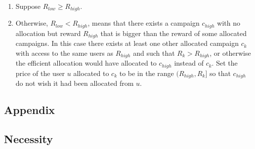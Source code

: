 \documentclass[12pt,letterpaper]{article}
\newcommand{\Campaign}{c}
\newcommand{\User}{u}
\newcommand{\Reward}{R}
\newcommand{\Price}{P}
\begin{document}
\begin{enumerate}
 \item Suppose $\Reward_{low} \ge \Reward_{high}$. 
 
 

 \item Otherwise, $\Reward_{low} < \Reward_{high}$, means that there exists a campaign $\Campaign_{high}$ with no allocation but reward $\Reward_{high}$ that is bigger
 than the reward of some allocated campaigns. 
 In this case there exists at least one other allocated campaign $\Campaign_k$ with access to the same users as 
 $\Reward_{high}$ and such that $\Reward_k > R_{high}$, or otherwise the efficient allocation would have allocated to $\Campaign_{high}$ instead of $\Campaign_k$.
 Set the price of the user $\User$ allocated to $\Campaign_k$ to be in the range $(\Reward_{high},\Reward_k]$ so that $\Campaign_{high}$ do not wish it had
 been allocated from $\User$.
\end{enumerate}





\newpage

\subsection*{Appendix}


\subsection*{Necessity}
\end{document}
